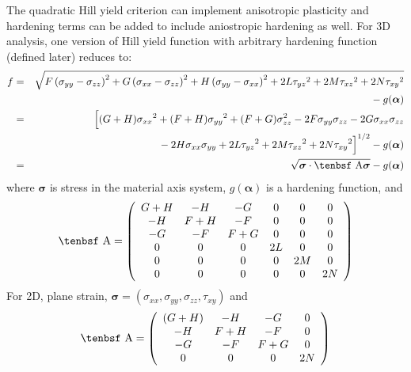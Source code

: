 \documentclass[11pt]{book}
\renewcommand{\vec}[1]{\boldsymbol{#1}}
\def\A{\hbox{\tenbsf A}}
\def\s#1{\sigma_{#1}}
\def\t#1{\tau_{#1}}
\begin{document}
The quadratic Hill yield criterion can implement anisotropic plasticity and hardening terms can be added to include aniostropic hardening as well. For 3D analysis, one version of Hill yield function with arbitrary hardening function (defined later) reduces to:
\begin{eqnarray}
          f & = & \sqrt{F\left({\s{yy}}- {\s{zz}}\right)^2 + G\left({\s{xx}}- {\s{zz}}\right)^2
               + H\left({\s{yy}}- {\s{xx}}\right)^2 +2L{\t{yz}}^2 +2M{\t{xz}}^2
                 +2N{\t{xy}}^2}
  \nonumber\\
 &&\qquad\mbox{}
                 - g(\vec\alpha) \\
             & = & \Bigl[(G+H){\s{xx}}^2  + (F+H){\s{yy}}^2 + (F+G)\s{zz}^2
                   -2F {\s{yy}}\s{zz} - 2G {\s{xx}}\s{zz}
 \nonumber\\
 &&\qquad\mbox{}
                    - 2H {\s{xx}}{\s{yy}}
                   +2L{\t{yz}}^2 +2M{\t{xz}}^2+2N{\t{xy}}^2\Bigr]^{1/2}  - g(\vec\alpha) \\
             & = & \sqrt{{\vec\sigma} \cdot \A {\vec\sigma}} - g(\vec\alpha) 
\end{eqnarray}
where ${\vec\sigma}$ is stress in the material axis system, $g(\vec\alpha)$ is a hardening function, and
\begin{equation}
      \A = \left( \begin{array}{cccccc}
                       G+H & -H & -G & 0 & 0 & 0 \\
                       -H & F+H & -F & 0 & 0 & 0\\
                       -G & -F & F+G & 0 & 0 & 0\\
                        0 & 0 & 0 & 2L & 0 & 0 \\
                       0 & 0 & 0 & 0 & 2M & 0 \\
                      0 & 0 & 0 & 0 & 0 & 2N
                       \end{array} \right)
\end{equation}
For 2D, plane strain, ${\vec\sigma} = ({\s{xx}}, {\s{yy}}, \s{zz}, {\t{xy}})$ and
\begin{equation}
      \A = \left( \begin{array}{cccc}
                       (G+H) & -H & -G & 0 \\
                       -H & F+H & -F & 0 \\
                       -G & -F & F+G & 0 \\
                       0 & 0 & 0 & 2N
                       \end{array} \right)
\end{equation}
\end{document}

